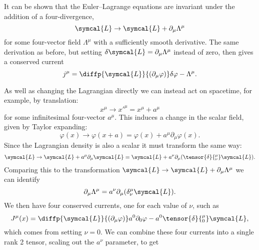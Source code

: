 \documentclass[fleqn]{NotesClass}
\newcommand{\lagrangianDensity}{\symcal{L}}
\begin{document}
    It can be shown that the Euler--Lagrange equations are invariant under the addition of a four-divergence, 
    \begin{equation}
        \lagrangianDensity \to \lagrangianDensity + \partial_\mu \Lambda^\mu
    \end{equation}
    for some four-vector field \(\Lambda^\mu\) with a sufficiently smooth derivative.
    The same derivation as before, but setting \(\delta\lagrangianDensity = \partial_\mu \Lambda^\mu\) instead of zero, then gives a conserved current
    \begin{equation}
        j^\mu = \diffp{\lagrangianDensity}{(\partial_\mu\varphi)} \delta\varphi - \Lambda^\mu.
    \end{equation}
    
    As well as changing the Lagrangian directly we can instead act on spacetime, for example, by translation:
    \begin{equation}
        x^\mu \to x'^\mu = x^\mu + a^\mu
    \end{equation}
    for some infinitesimal four-vector \(a^\mu\).
    This induces a change in the scalar field, given by Taylor expanding:
    \begin{equation}
        \varphi(x) \to \varphi(x + a) = \varphi(x) + a^\mu \partial_\mu \varphi(x).
    \end{equation}
    Since the Lagrangian density is also a scalar it must transform the same way:
    \begin{equation}
        \lagrangianDensity \to \lagrangianDensity + a^\mu \partial_\mu \lagrangianDensity = \lagrangianDensity + a^\nu \partial_\mu (\tensor{\delta}{^\mu_\nu} \lagrangianDensity).
    \end{equation}
    Comparing this to the transformation \(\lagrangianDensity \to \lagrangianDensity + \partial_\mu \Lambda^\mu\) we can identify
    \begin{equation}
        \partial_\mu \Lambda^\mu = a^\nu \partial_\mu (\delta^\mu_\nu \lagrangianDensity).
    \end{equation}
    We then have four conserved currents, one for each value of \(\nu\), such as
    \begin{equation}
        J^\mu(x) = \diffp{\lagrangianDensity}{(\partial_\mu \varphi)}a^0\partial_0\varphi - a^0 \tensor{\delta}{^\mu_0}\lagrangianDensity,
    \end{equation}
    which comes from setting \(\nu = 0\).
    We can combine these four currents into a single rank 2 tensor, scaling out the \(a^\nu\) parameter, to get
\end{document}
